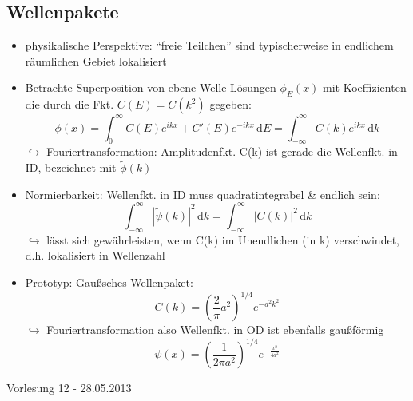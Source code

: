 \documentclass[10pt,article,colorback,accentcolor=tud9d]{scrartcl}
\begin{document}
\subsection{Wellenpakete}
\begin{itemize}
  \item physikalische Perspektive: ``freie Teilchen'' sind typischerweise in endlichem räumlichen Gebiet lokalisiert
  \item Betrachte Superposition von ebene-Welle-Lösungen $ \phi_E(x) $ mit Koeffizienten die durch die Fkt. $C(E) = C(k^2) $ gegeben:
    \begin{equation}
       \phi(x) = \int_{0}^{\infty} C(E)e^{ikx} + C'(E)e^{-ikx} \, \mathrm{d}E = \int_{-\infty}^{\infty} C(k)e^{ikx} \, \mathrm{d}k
    \end{equation}
    $ \hookrightarrow $ Fouriertransformation: Amplitudenfkt. C(k) ist gerade die Wellenfkt. in ID, bezeichnet mit $ \tilde{\phi}(k) $
  \item Normierbarkeit: Wellenfkt. in ID muss quadratintegrabel \& endlich sein:
    \begin{equation}
      \int_{-\infty}^{\infty} |\tilde{\psi}(k)|^2 \, \mathrm{d}k = \int_{-\infty}^{\infty} |C(k)|^2 \, \mathrm{d}k
    \end{equation}
    $ \hookrightarrow $ lässt sich gewährleisten, wenn C(k) im Unendlichen (in k) verschwindet, d.h. lokalisiert in Wellenzahl
  \item Prototyp: Gaußsches Wellenpaket:
    \begin{equation}
      C(k) = \left(\frac{2}{\pi}a^2 \right)^{1/4} e^{-a^2k^2}
    \end{equation}
    $ \hookrightarrow $ Fouriertransformation also Wellenfkt. in OD ist ebenfalls gaußförmig
    \begin{equation}
      \psi(x) = \left(\frac{1}{2\pi a^2} \right)^{1/4} e^{-\frac{x^2}{4a^2}}
    \end{equation}




\end{itemize}




\begin{flushright}
Vorlesung 12 - 28.05.2013
\end{flushright}
\end{document}
